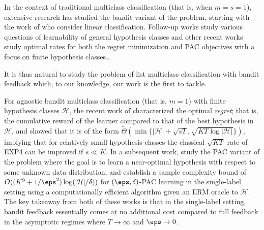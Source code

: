 \documentclass[11pt]{article}
\newcommand{\calH}{\mathcal{H}}
\theoremstyle{plain}
\begin{document}
In the context of traditional multiclass classification (that is, when $m=s=1$), extensive research has studied the bandit variant of the problem, starting with the work of \cite{kakade2008efficient} who consider linear classification. Follow-up works study various questions of learnability of general hypothesis classes \citep{daniely2011multiclass,daniely2013price,raman2023multiclass, filmus2024bandit} and other recent works \cite{erez2024real,erez2024fast} study optimal rates for both the regret minimization and PAC objectives with a focus on finite hypothesis classes.. 

It is thus natural to study the problem of list multiclass classification with bandit feedback which, to our knowledge, our work is the first to tackle.

For agnostic bandit multiclass classification (that is, $m=1$) with finite hypothesis classes $\calH$, the recent work of \cite{erez2024real} characterized the optimal \emph{regret}; that is, the cumulative reward of the learner compared to that of the best hypothesis in $\calH$, and showed that it is of the form $\widetilde \Theta (\min \{|\calH| + \sqrt{sT}, \sqrt{KT \log |\calH|}\})$, implying that for relatively small hypothesis classes the classical $\sqrt{KT}$ rate of EXP4 \citep{auer2002nonstochastic} can be improved if $s \ll K$. In a subsequent work, \cite{erez2024fast} study the PAC variant of the problem where the goal is to learn a near-optimal hypothesis with respect to some unknown data distribution, and establish a sample complexity bound of $O((K^9 + 1/\eps^2) \log(|\calH|/\delta))$ for $(\eps,\delta)$-PAC learning in the single-label setting using a computationally efficient algorithm given an ERM oracle to $\calH$. The key takeaway from both of these works is that in the single-label setting, bandit feedback essentially comes at no additional cost compared to full feedback in the asymptotic regimes where $T \to \infty$ and $\eps \to 0$.
\end{document}
